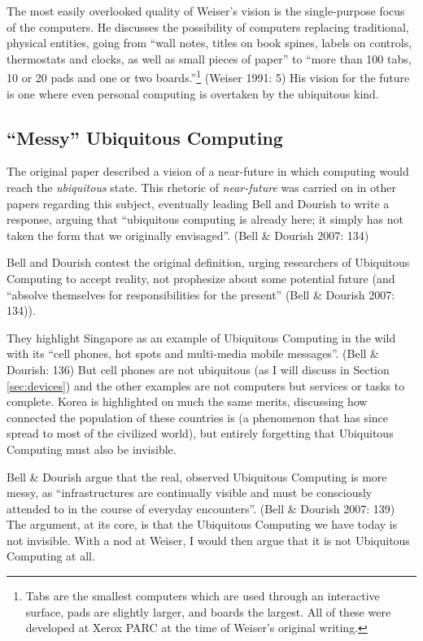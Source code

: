The most easily overlooked quality of Weiser's vision is the single-purpose focus of the computers. He discusses
the possibility of computers replacing traditional, physical entities, going from ``wall notes, titles on book spines,
labels on controls, thermostats and clocks, as well as small pieces of paper'' to ``more than 100 tabs, 10 or 20 pads
and one or two boards.''\footnote{Tabs are the smallest computers which are used through an interactive surface, pads
are slightly larger, and boards the largest. All of these were developed at Xerox PARC at the time of Weiser's original
writing.} (Weiser 1991: 5) His vision for the future is one where even personal computing is overtaken by the ubiquitous
kind.

\subsection*{``Messy'' Ubiquitous Computing}

The original paper described a vision of a near-future in which computing would reach the \emph{ubiquitous} state.
This rhetoric of \emph{near-future} was carried on in other papers regarding this subject, eventually leading Bell
and Dourish to write a response, arguing that ``ubiquitous computing is already here; it simply has not taken the
form that we originally envisaged''. (Bell \& Dourish 2007: 134)

Bell and Dourish contest the original definition, urging researchers of Ubiquitous Computing to accept reality, not
prophesize about some potential future (and ``absolve themselves for responsibilities for the present'' (Bell \& Dourish 2007: 134)).

They highlight Singapore as an example of Ubiquitous Computing in the wild with its ``cell phones, hot spots and
multi-media mobile messages''. (Bell \& Dourish: 136) But cell phones are not ubiquitous (as I will discuss in Section \ref{sec:devices}) and
the other examples are not computers but services or tasks to complete. Korea is highlighted on much the same merits,
discussing how connected the population of these countries is (a phenomenon that has since spread to most of the civilized
world), but entirely forgetting that Ubiquitous Computing must also be invisible.

Bell \& Dourish argue that the real, observed Ubiquitous Computing is more messy, as ``infrastructures are continually visible and
must be consciously attended to in the course of everyday encounters''. (Bell \& Dourish 2007: 139) The argument, at its core, is that
the Ubiquitous Computing we have today is not invisible. With a nod at Weiser, I would then argue that it is not Ubiquitous
Computing at all.

